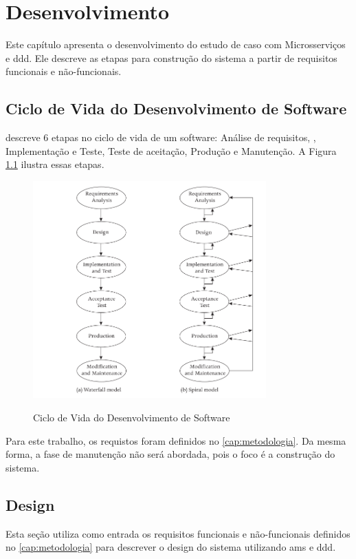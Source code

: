 \chapter{Desenvolvimento}
\label{cap:desenvolvimento}

Este capítulo apresenta o desenvolvimento do estudo de caso com Microsserviços e \acrshort{ddd}. Ele descreve as etapas para construção do sistema a partir de requisitos funcionais e não-funcionais.

\section{Ciclo de Vida do Desenvolvimento de Software}
 descreve 6 etapas no ciclo de vida de um software: Análise de requisitos, , Implementação e Teste, Teste de aceitação, Produção e Manutenção. A Figura \ref{fig:ciclo-vida} ilustra essas etapas. 

\begin{figure}[H]
    \centering
    \caption{Ciclo de Vida do Desenvolvimento de Software}
    \includegraphics[width=0.8\textwidth]{media/software-life-cycle.png}
    \label{fig:ciclo-vida}
\end{figure}

Para este trabalho, os requistos foram definidos no \autoref{cap:metodologia}. Da mesma forma, a fase de manutenção não será abordada, pois o foco é a construção do sistema.

\section{Design}
Esta seção utiliza como entrada os requisitos funcionais e não-funcionais definidos no \autoref{cap:metodologia} para descrever o design do sistema utilizando \acrfull{ams} e \acrfull{ddd}.

